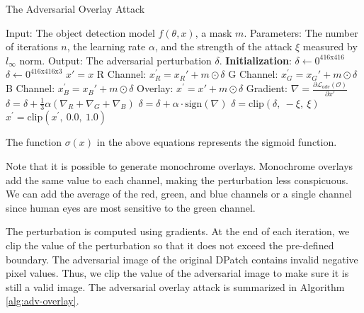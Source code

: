 \begin{algorithm}[H]
    \caption{The Adversarial Overlay Attack}\label{alg:adv-overlay}
    \begin{algorithmic}
        \State Input: The object detection model $f(\theta, x)$, a mask $m$.
        \State Parameters: The number of iterations $n$, the learning rate $\alpha$, and the strength of the attack $\xi$ measured by $l_{\infty}$ norm.
        \State Output: The adversarial perturbation $\delta$.
        \State \textbf{Initialization}: 
            \State $\delta \leftarrow 0^{416\text{x}416}$
        \Else
            \State $\delta \leftarrow 0^{416\text{x}416\text{x}3}$
        \EndIf
            \State $x' = x$
                \State R Channel: $x_R^{'} = x_R' + m \odot \delta$
                \State G Channel: $x_G^{'} = x_G' + m \odot \delta$
                \State B Channel: $x_B^{'} = x_B' + m \odot \delta$
                \Else
                    \State Overlay: $x^{'} = x' + m \odot \delta$
                \EndIf
                \State Gradient: $\nabla = \frac{\partial \mathcal{L}_{adv}(\mathcal{O})}{\partial x'}$
                    \State $\delta = \delta +  \frac{1}{3}\alpha(\nabla_R + \nabla_G + \nabla_B) $
                \Else
                    \State $\delta = \delta + \alpha \cdot \text{sign}(\nabla)$
                \EndIf
                \State $\delta = \text{clip}(\delta,\ -\xi,\ \xi)$
                \State $x^{'} = \text{clip}(x^{'},\ 0.0,\ 1.0)$
            \EndFor
        \EndFor
    \end{algorithmic}
\end{algorithm}

The function $\sigma (x)$ in the above equations represents the sigmoid function.

Note that it is possible to generate monochrome overlays. Monochrome overlays add the same value to each channel, making the perturbation less conspicuous. We can add the average of the red, green, and blue channels or a single channel since human eyes are most sensitive to the green channel.

The perturbation is computed using gradients. At the end of each iteration, we clip the value of the perturbation so that it does not exceed the pre-defined boundary. The adversarial image of the original DPatch \citep{liu2018dpatch} contains invalid negative pixel values. Thus, we clip the value of the adversarial image to make sure it is still a valid image. The adversarial overlay attack is summarized in Algorithm \ref{alg:adv-overlay}.

